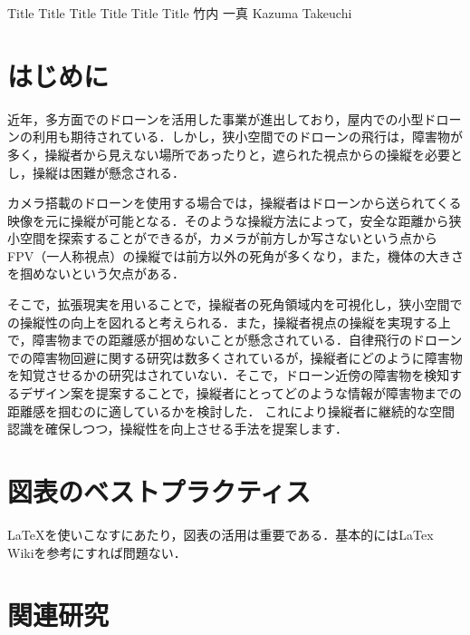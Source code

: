 \documentclass[a4paper,10pt,twocolumn,uplatex]{jsarticle}
\date{1}
\begin{document}
{Title Title Title Title Title Title}
{竹内 一真}
{Kazuma Takeuchi}

\section{はじめに}
近年，多方面でのドローンを活用した事業が進出しており，屋内での小型ドローンの利用も期待されている．しかし，狭小空間でのドローンの飛行は，障害物が多く，操縦者から見えない場所であったりと，遮られた視点からの操縦を必要とし，操縦は困難が懸念される．
\par
カメラ搭載のドローンを使用する場合では，操縦者はドローンから送られてくる映像を元に操縦が可能となる．そのような操縦方法によって，安全な距離から狭小空間を探索することができるが，カメラが前方しか写さないという点からFPV（一人称視点）の操縦では前方以外の死角が多くなり，また，機体の大きさを掴めないという欠点がある．
\par
そこで，拡張現実を用いることで，操縦者の死角領域内を可視化し，狭小空間での操縦性の向上を図れると考えられる．また，操縦者視点の操縦を実現する上で，障害物までの距離感が掴めないことが懸念されている．自律飛行のドローンでの障害物回避に関する研究は数多くされているが，操縦者にどのように障害物を知覚させるかの研究はされていない．そこで，ドローン近傍の障害物を検知するデザイン案を提案することで，操縦者にとってどのような情報が障害物までの距離感を掴むのに適しているかを検討した．
これにより操縦者に継続的な空間認識を確保しつつ，操縦性を向上させる手法を提案します．

\section{図表のベストプラクティス}
\LaTeX{}を使いこなすにあたり，図表の活用は重要である．基本的にはLaTex Wiki\cite{latex_wiki}を参考にすれば問題ない．\par
\section{関連研究}
\end{document}
